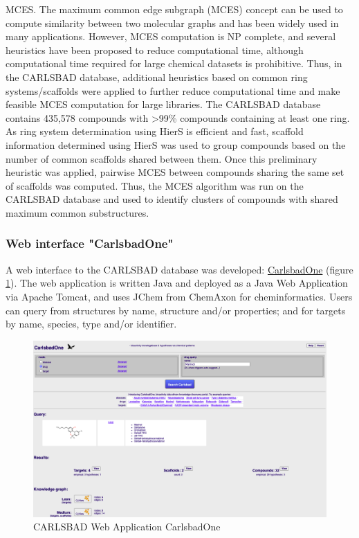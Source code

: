 MCES. The maximum common edge subgraph (MCES) concept\cite{Raymond2002-ep} can be used to compute similarity between two molecular graphs and has been widely used in many applications\cite{Stahl2005-bl,Sheridan2006-nx,Gardiner2007-ur,Bocker2008-uh,Hariharan2011-qx,Bostrom2012-fb}. However, MCES computation is NP complete, and several heuristics have been proposed to reduce computational time, although computational time required for large chemical datasets is prohibitive. Thus, in the CARLSBAD database, additional heuristics based on common ring systems/scaffolds were applied to further reduce computational time and make feasible MCES computation for large libraries. The CARLSBAD database contains 435,578 compounds with \textgreater99\% compounds containing at least one ring. As ring system determination using HierS is efficient and fast, scaffold information determined using HierS was used to group compounds based on the number of common scaffolds shared between them. Once this preliminary heuristic was applied, pairwise MCES between compounds sharing the same set of scaffolds was computed. Thus, the MCES algorithm was run on the CARLSBAD database and used to identify clusters of compounds with shared maximum common substructures.

\subsubsection{Web interface "CarlsbadOne"}

A web interface to the CARLSBAD database was developed:  \href{https://datascience.unm.edu/tomcat/carlsbad/carlsbadone}{CarlsbadOne} (figure \ref{fig:cb_cbone_01}). The web application is written Java and deployed as a Java Web Application via Apache Tomcat, and uses JChem from ChemAxon for cheminformatics. Users can query from structures by name, structure and/or properties; and for targets by name, species, type and/or identifier.

\begin{figure}
    \centering
    \includegraphics[width=\textwidth]{figures/carlsbad/CARLSBAD_CBOne_Marinol_01.png}
    \caption{CARLSBAD Web Application CarlsbadOne}
    \label{fig:cb_cbone_01}
\end{figure}

